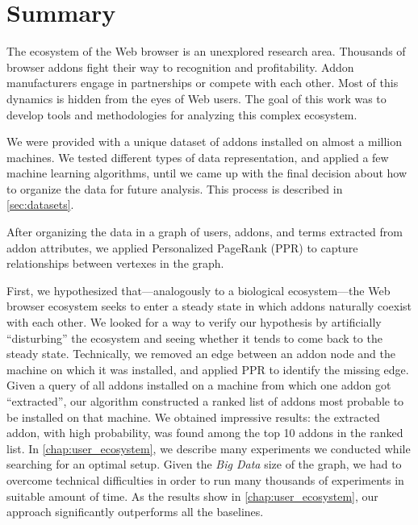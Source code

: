 \documentclass[11pt,oneside]{book}
\begin{document}
\chapter{Summary}
\label{chap:summary}
The ecosystem of the Web browser is an unexplored research area. Thousands of browser addons fight their way to recognition and profitability. Addon manufacturers engage in partnerships or compete with each other. Most of this dynamics is hidden from the eyes of Web users. The goal of this work was to develop tools and methodologies for analyzing this complex ecosystem.

We were provided with a unique dataset of addons installed on almost a million machines. We tested different types of data representation, and applied a few machine learning algorithms, until we came up with the final decision about how to organize the data for future analysis. This process is described in \autoref{sec:datasets}.

After organizing the data in a graph of users, addons, and terms extracted from addon attributes, we applied Personalized PageRank (PPR) to capture relationships between vertexes in the graph.

First, we hypothesized that---analogously to a biological ecosystem---the Web browser ecosystem seeks to enter a steady state in which addons naturally coexist with each other. We looked for a way to verify our hypothesis by artificially ``disturbing'' the ecosystem and seeing whether it tends to come back to the steady state. Technically, we removed an edge between an addon node and the machine on which it was installed, and applied PPR to identify the missing edge. Given a query of all addons installed on a machine from which one addon got ``extracted'', our algorithm constructed a ranked list of addons most probable to be installed on that machine. We obtained impressive results: the extracted addon, with high probability, was found among the top 10 addons in the ranked list. In \autoref{chap:user_ecosystem}, we describe many experiments we conducted while searching for an optimal setup. Given the \emph{Big Data} size of the graph, we had to overcome technical difficulties in order to run many thousands of experiments in suitable amount of time. As the results show in \autoref{chap:user_ecosystem}, our approach significantly outperforms all the baselines.
\end{document}
